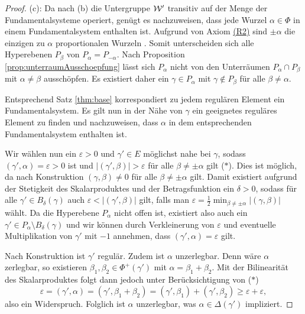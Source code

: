 \begin{proof}
  (c):
  Da nach (b) die Untergruppe $\mathcal{W}'$ transitiv auf der Menge der Fundamentalsysteme operiert, genügt es nachzuweisen, dass jede Wurzel $\alpha \in \Phi$ in einem Fundamentalsystem enthalten ist.
  Aufgrund von Axiom \hyperref[it:R2]{(R2)} sind $\pm \alpha$ die einzigen zu $\alpha$ proportionalen Wurzeln .
  Somit unterscheiden sich alle Hyperebenen $P_\beta$ von $P_\alpha = P_{-\alpha}$.
  Nach Proposition \ref{prop:unterraumAusschoepfung} lässt sich $P_\alpha$ nicht von den Unterräumen $P_\alpha \cap P_\beta$ mit $\alpha \neq \beta$ ausschöpfen.
  Es existiert daher ein $\gamma \in P_\alpha$ mit $\gamma \not\in P_\beta$ für alle $\beta \neq \alpha$.

  Entsprechend Satz \ref{thm:base} korrespondiert zu jedem regulären Element ein Fundamentalsystem. Es gilt nun in der Nähe von $\gamma$ ein geeignetes reguläres Element zu finden und nachzuweisen, dass $\alpha$ in dem entsprechenden Fundamentalsystem enthalten ist.

  Wir wählen nun ein $\varepsilon > 0$ und $\gamma' \in E$ möglichst nahe bei $\gamma$, sodass $(\gamma', \alpha) = \varepsilon > 0$ ist und $|(\gamma', \beta)| > \varepsilon$ für alle $\beta \neq \pm \alpha$ gilt ($\ast$).
  Dies ist möglich, da nach Konstruktion $(\gamma, \beta) \neq 0$ für alle $\beta \neq \pm \alpha$ gilt.
  Damit existiert aufgrund der Stetigkeit des Skalarproduktes und der Betragsfunktion ein $\delta > 0$, sodass für alle $\gamma' \in B_\delta(\gamma)$ auch $\varepsilon < |(\gamma', \beta)|$ gilt, falls man $\varepsilon = \tfrac{1}{2} \min_{\beta \neq \pm\alpha}{|(\gamma,\beta)|}$ wählt.
  Da die Hyperebene $P_\alpha$ nicht offen ist, existiert also auch ein $\gamma' \in P_\alpha \setminus B_\delta(\gamma)$ und wir können durch Verkleinerung von $\varepsilon$ und eventuelle Multiplikation von $\gamma'$ mit $-1$ annehmen, dass $(\gamma', \alpha) = \varepsilon$ gilt.

  Nach Konstruktion ist $\gamma'$ regulär.
  Zudem ist $\alpha$ unzerlegbar.
  Denn wäre $\alpha$ zerlegbar, so existieren $\beta_1, \beta_2 \in \Phi^+(\gamma')$ mit $\alpha = \beta_1 + \beta_2$.
  Mit der Bilinearität des Skalarproduktes folgt dann jedoch unter Berücksichtigung von ($\ast$)
  \begin{displaymath}
    \varepsilon 
    = (\gamma', \alpha) 
    = (\gamma', \beta_1 + \beta_2) 
    = (\gamma', \beta_1) + (\gamma', \beta_2)
    \geq \varepsilon + \varepsilon,
  \end{displaymath}
  also ein Widerspruch.
  Folglich ist $\alpha$ unzerlegbar, was $\alpha \in \Delta(\gamma')$ impliziert.


\end{proof}
